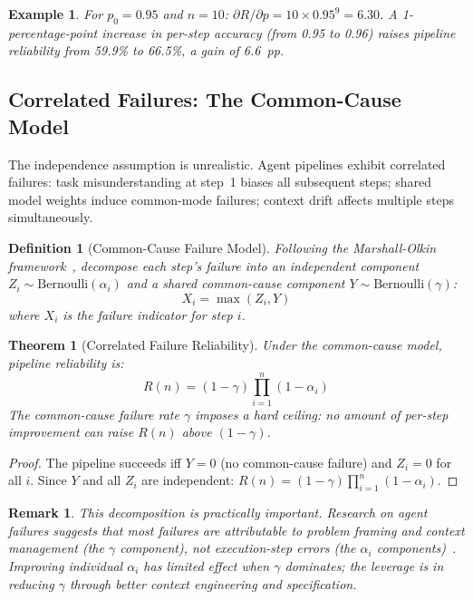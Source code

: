 \documentclass[11pt, a4paper, copyright]{googledeepmind}
\newtheorem{definition}{Definition}[section]
\newtheorem{theorem}{Theorem}[section]
\newtheorem*{remark}{Remark}
\newtheorem{example}{Example}[section]
\begin{document}
\begin{example}
For $p_0 = 0.95$ and $n = 10$: $\partial R/\partial p = 10 \times 0.95^9 = 6.30$.
A 1-percentage-point increase in per-step accuracy (from 0.95 to 0.96) raises pipeline reliability from 59.9\% to 66.5\%, a gain of 6.6~pp.
\end{example}

\subsection{Correlated Failures: The Common-Cause Model}

The independence assumption is unrealistic.
Agent pipelines exhibit correlated failures: task misunderstanding at step~1 biases all subsequent steps; shared model weights induce common-mode failures; context drift affects multiple steps simultaneously.

\begin{definition}[Common-Cause Failure Model]
\label{def:commoncause}
Following the Marshall-Olkin framework~\citep{marshall1967multivariate}, decompose each step's failure into an independent component $Z_i \sim \text{Bernoulli}(\alpha_i)$ and a shared common-cause component $Y \sim \text{Bernoulli}(\gamma)$:
\begin{equation}
X_i = \max(Z_i, Y)
\end{equation}
where $X_i$ is the failure indicator for step $i$.
\end{definition}

\begin{theorem}[Correlated Failure Reliability]
\label{thm:correlated}
Under the common-cause model, pipeline reliability is:
\begin{equation}
R(n) = (1 - \gamma) \prod_{i=1}^{n} (1 - \alpha_i)
\end{equation}
The common-cause failure rate $\gamma$ imposes a hard ceiling: no amount of per-step improvement can raise $R(n)$ above $(1 - \gamma)$.
\end{theorem}

\begin{proof}
The pipeline succeeds iff $Y = 0$ (no common-cause failure) and $Z_i = 0$ for all $i$.
Since $Y$ and all $Z_i$ are independent: $R(n) = (1-\gamma)\prod_{i=1}^{n}(1-\alpha_i)$.
\end{proof}

\begin{remark}
This decomposition is practically important.
Research on agent failures suggests that most failures are attributable to problem framing and context management (the $\gamma$ component), not execution-step errors (the $\alpha_i$ components)~\citep{cemri2025multiagent}.
Improving individual $\alpha_i$ has limited effect when $\gamma$ dominates; the leverage is in reducing $\gamma$ through better context engineering and specification.
\end{remark}
\end{document}
